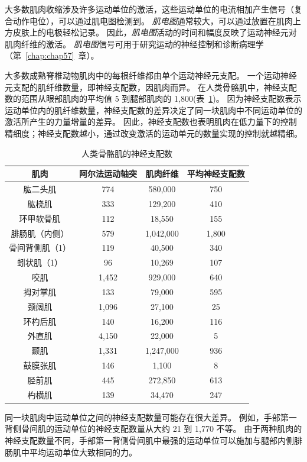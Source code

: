 大多数肌肉收缩涉及许多运动单位的激活，这些运动单位的电流相加产生信号（复合动作电位），可以通过肌电图检测到。
\textit{肌电图}通常较大，可以通过放置在肌肉上方皮肤上的电极轻松记录。
因此，\textit{肌电图}活动的时间和幅度反映了运动神经元对肌肉纤维的激活。
\textit{肌电图}信号可用于研究运动的神经控制和诊断病理学（第~\ref{chap:chap57}~章）。


大多数成熟脊椎动物肌肉中的每根纤维都由单个运动神经元支配。
一个运动神经元支配的肌纤维数量，即神经支配数，因肌肉而异。
在人类骨骼肌中，神经支配数的范围从眼部肌肉的平均值 5 到腿部肌肉的 1,800(表~\ref{tab:31_1})。
因为神经支配数表示运动单位内的肌纤维数量，神经支配数的差异决定了同一块肌肉中不同运动单位的激活所产生的力量增量的差异。
因此，神经支配数也表明肌肉在低力量下的控制精细度；神经支配数越小，通过改变激活的运动单元的数量实现的控制就越精细。


\begin{table}[htbp]
	\caption{人类骨骼肌的神经支配数\label{tab:31_1}}
	\centering
	\begin{tabular}{cccc}
		\toprule
		肌肉 & 阿尔法运动轴突 & 肌肉纤维 & 平均神经支配数\\
		\midrule
		肱二头肌 & 774  & 580,000 & 750 \\
		肱桡肌 & 333  & 129,200 & 410 \\
		环甲软骨肌 & 112  & 18,550 & 155 \\
		腓肠肌（内侧） & 579  & 1,042,000 & 1,800 \\
		骨间背侧肌（1） & 119  & 40,500 & 340 \\
		蚓状肌（1） & 96  & 10,269 & 107 \\
		咬肌 & 1,452  & 929,000 & 640 \\
		拇对掌肌 & 133  & 79,000 & 595 \\
		颈阔肌 & 1,096  & 27,100 & 25 \\
		环杓后肌 & 140  & 16,200 & 116 \\
		外直肌 & 4,150  & 22,000 & 5 \\
		颞肌 & 1,331  & 1,247,000 & 936 \\
		鼓膜张肌 & 146  & 1,100 & 8 \\
		胫前肌 & 445  & 272,850 & 613 \\
		杓横肌 & 139  & 34,470 & 247 \\
		\bottomrule
	\end{tabular}
\end{table}


同一块肌肉中运动单位之间的神经支配数量可能存在很大差异。
例如，手部第一背侧骨间肌的运动单位的神经支配数量从大约 21 到 1,770 不等。
由于两种肌肉的神经支配数量不同，手部第一背侧骨间肌中最强的运动单位可以施加与腿部内侧腓肠肌中平均运动单位大致相同的力。


